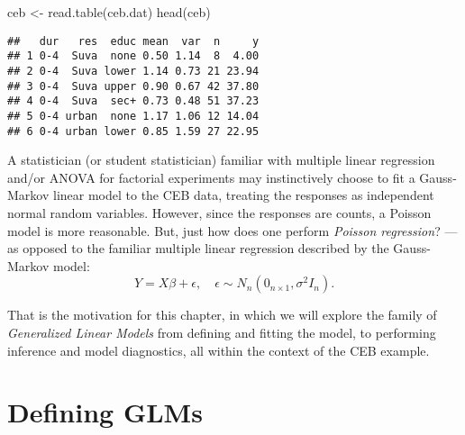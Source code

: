 \documentclass[
]{book}
\newenvironment{Shaded}{\begin{snugshade}}{\end{snugshade}}
\newcommand{\FunctionTok}[1]{\textcolor[rgb]{0.00,0.00,0.00}{#1}}
\newcommand{\NormalTok}[1]{#1}
\newcommand{\OtherTok}[1]{\textcolor[rgb]{0.56,0.35,0.01}{#1}}
\newcommand{\StringTok}[1]{\textcolor[rgb]{0.31,0.60,0.02}{#1}}
\begin{document}
\begin{Shaded}
\begin{Highlighting}[]
\NormalTok{ceb }\OtherTok{\textless{}{-}} \FunctionTok{read.table}\NormalTok{(}\StringTok{\textquotesingle{}ceb.dat\textquotesingle{}}\NormalTok{)}
\FunctionTok{head}\NormalTok{(ceb)}
\end{Highlighting}
\end{Shaded}

\begin{verbatim}
##   dur   res  educ mean  var  n     y
## 1 0-4  Suva  none 0.50 1.14  8  4.00
## 2 0-4  Suva lower 1.14 0.73 21 23.94
## 3 0-4  Suva upper 0.90 0.67 42 37.80
## 4 0-4  Suva  sec+ 0.73 0.48 51 37.23
## 5 0-4 urban  none 1.17 1.06 12 14.04
## 6 0-4 urban lower 0.85 1.59 27 22.95
\end{verbatim}

A statistician (or student statistician) familiar with multiple linear regression and/or ANOVA for factorial experiments may instinctively choose to fit a Gauss-Markov linear model to the CEB data, treating the responses as independent normal random variables. However, since the responses are counts, a Poisson model is more reasonable. But, just how does one perform \emph{Poisson regression}? --- as opposed to the familiar multiple linear regression described by the Gauss-Markov model:
\[Y = X\beta+ \epsilon, \quad \epsilon \sim N_{n}(0_{n\times 1}, \sigma^2 I_n).\]

That is the motivation for this chapter, in which we will explore the family of \emph{Generalized Linear Models} from defining and fitting the model, to performing inference and model diagnostics, all within the context of the CEB example.

\hypertarget{defining-glms}{%
\section{Defining GLMs}\label{defining-glms}}
\end{document}
